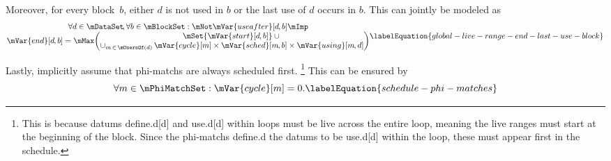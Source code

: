 Moreover, for every \gls{block}~$b$\hspace{-1pt}, either $d$ is not used in $b$
or the last use of $d$ occurs in $b$\hspace{-1pt}.
%
This can jointly be modeled as
%
\begin{equation}
  \begin{array}{@{}c@{}}
    \forall d \in \mDataSet \!,
    \forall b \in \mBlockSet :
    \mNot\mVar{useafter}[d \hspace{-.8pt}, b]
    \mImp \mbox{} \\
    \mVar{end}[d \hspace{-.8pt}, b]
    =
    \mMax\!
    \left(
      \begin{array}{@{}c@{}}
        \mSet{\mVar{start}[d \hspace{-.8pt}, b]} \cup \mbox{} \\
        \cup_{m \,\in\, \mUsersOf(d)} \,
        \mVar{cycle}[m]
        \times
        \mVar{sched}[m \hspace{-.8pt}, b]
        \times
        \mVar{using}[m \hspace{-.8pt}, d]
      \end{array}
    \right)
  \end{array}
  \labelEquation{global-live-range-end-last-use-block}
\end{equation}

Lastly,  implicitly assume that \glspl{phi-match}
are always scheduled first.\!%
%
\footnote{%
  This is because \glspl{datum} \gls{define.d}[d] and \gls{use.d}[d] within
  loops must be live across the entire loop, meaning the \glspl{live range} must
  start at the beginning of the \gls{block}.
  Since the \glspl{phi-match} \gls{define.d} the \glspl{datum} to be
  \gls{use.d}[d] within the loop, these must appear first in the schedule.
}
%
This can be ensured by
%
\begin{equation}
  \forall m \in \mPhiMatchSet :
  \mVar{cycle}[m] = 0.
  \labelEquation{schedule-phi-matches}
\end{equation}
